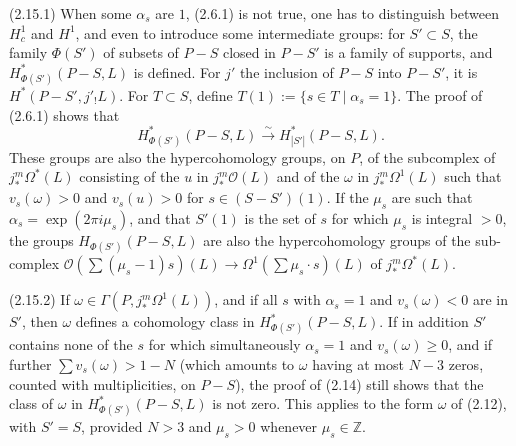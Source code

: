 \documentclass[12pt,a4paper]{article}
\theoremstyle{plain}
\theoremstyle{definition}
\theoremstyle{remark}
\newcommand{\ZZ}{\mathbb{Z}}
\numberwithin{equation}{section}
\providecommand{\ZZ}{\mathbb{Z}}
\begin{document}
(2.15.1) When some $\alpha_s$ are $1$, (2.6.1) is not true, one has to distinguish between $H^1_c$ and $H^1$, and even to introduce some intermediate groups: for $S' \subset S$, the family $\Phi(S')$ of subsets of $P-S$ closed in $P-S'$ is a family of supports, and $H^*_{\Phi(S')}(P-S, L)$ is defined. For $j'$ the inclusion of $P-S$ into $P-S'$, it is $H^*(P-S', j'_!L)$. For $T \subset S$, define $T(1) := \{s \in T \mid \alpha_s = 1\}$. The proof of (2.6.1) shows that
\[
H^*_{\Phi(S')}(P-S, L) \xrightarrow{\sim} H^*_{|S'|}(P-S, L).
\]
These groups are also the hypercohomology groups, on $P$, of the subcomplex of $j_*^m \Omega^*(L)$ consisting of the $u$ in $j_*^m \mathcal{O}(L)$ and of the $\omega$ in $j_*^m \Omega^1(L)$ such that $v_s(\omega) > 0$ and $v_s(u) > 0$ for $s \in (S-S')(1)$. If the $\mu_s$ are such that $\alpha_s = \exp(2\pi i \mu_s)$, and that $S'(1)$ is the set of $s$ for which $\mu_s$ is integral $> 0$, the groups $H_{\Phi(S')}(P-S, L)$ are also the hypercohomology groups of the sub-complex $\mathcal{O}(\sum(\mu_s-1)s)(L) \to \Omega^1(\sum \mu_s \cdot s)(L)$ of $j_*^m \Omega^*(L)$.

(2.15.2) If $\omega \in \Gamma(P, j_*^m \Omega^1(L))$, and if all $s$ with $\alpha_s = 1$ and $v_s(\omega) < 0$ are in $S'$, then $\omega$ defines a cohomology class in $H^*_{\Phi(S')}(P-S, L)$. If in addition $S'$ contains none of the $s$ for which simultaneously $\alpha_s = 1$ and $v_s(\omega) \geq 0$, and if further $\sum v_s(\omega) > 1-N$ (which amounts to $\omega$ having at most $N-3$ zeros, counted with multiplicities, on $P-S$), the proof of (2.14) still shows that the class of $\omega$ in $H^*_{\Phi(S')}(P-S, L)$ is not zero. This applies to the form $\omega$ of (2.12), with $S' = S$, provided $N > 3$ and $\mu_s > 0$ whenever $\mu_s \in \ZZ$.
\end{document}
